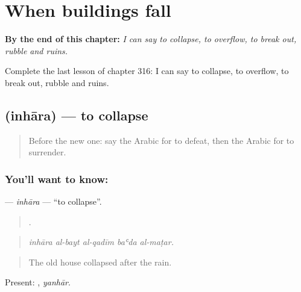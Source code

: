 
\chapter{When buildings fall}
\label{ch:ar-when-buildings-fall}

\begin{chapteropening}
\textbf{By the end of this chapter:} \emph{I can say to collapse, to overflow, to break out, rubble and ruins.}

Complete the last lesson of chapter 316: I can say to collapse, to overflow, to break out, rubble and ruins.
\end{chapteropening}

\section[\texorpdfstring{\ar{انهار} (inhāra)}{انهار (inhāra)}]{ (inhāra) — to collapse}

\label{lesson:AR-C316-inhara}



\begin{quote}
Before the new one: say the Arabic for to defeat, then the Arabic for to surrender.
\end{quote}

\subsection*{You'll want to know: }
\textbf{} — \emph{inhāra} — \textquotedblleft{}to collapse\textquotedblright{}.

\begin{quote}
    .
\end{quote}

\begin{quote}
\emph{inhāra al-bayt al-qadīm baʿda al-maṭar.}
\end{quote}

\begin{quote}
The old house collapsed after the rain.
\end{quote}

Present: , \emph{yanhār}.

